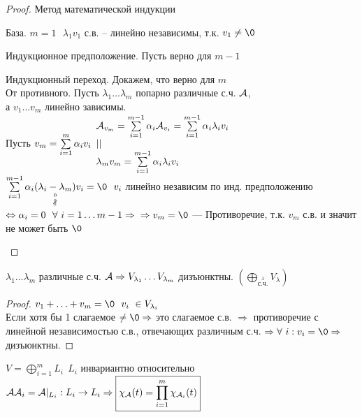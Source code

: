 \documentclass[../main.tex]{subfiles}
\begin{document}
	\begin{proof} Метод математической индукции
		\begin{mylist}
			\item База. $m=1 \ \ \ \lambda_1 v_1$ с.в. -- линейно независимы, т.к. $v_1\neq \0$
			\item Индукционное предположение. Пусть верно для $m-1$
			\item Индукционный переход. Докажем, что верно для $m$\\
			От противного. Пусть $\lambda_1\ldots \lambda_m $ попарно различные с.ч. $\A$,\\
			а $v_1\ldots v_m$ линейно зависимы.\\
			Пусть $v_m = \sum\limits_{i=1}^{m}\alpha_i v_i\\
			\begin{array}{l}
			\A_{v_m} = \sum\limits_{i=1}^{m-1}\alpha_i \A_{v_i} = \sum\limits_{i=1}^{m-1} \alpha_i \lambda_i v_i\\
			
			||
			\\
			\lambda_m v_m = \sum\limits_{i=1}^{m-1} \alpha_i \lambda_i v_i
			\end{array}$\\
			$\sum\limits_{i=1}^{m-1}\alpha_i(\underset{\stackrel{0}{\nparallel}}{\lambda_i - \lambda_m})v_i = \0 \ \ v_i$ линейно независим по инд. предположению\\
			$\Leftrightarrow \alpha_i = 0 \ \ \forall \ i=1\ldots m-1 \Rightarrow\\
			\Rightarrow v_m = \0$ --- Противоречие, т.к. $v_m$ с.в. и значит не может быть $\0$
		\end{mylist}
	\end{proof}
	\begin{corollary}
		$\lambda_1\ldots\lambda_m$ различные с.ч. $\A
		\Rightarrow  V_{\lambda_1}\ldots V_{\lambda_m}$ дизъюнктны.
		$\left(\bigoplus\limits_{\stackrel{\lambda}{\text{с.ч.}}} V_\lambda\right)$ 
	\end{corollary}
	\begin{proof}
		$v_1 + \ldots +v_m = \0 \ \ v_i\ \in V_{\lambda_i}$\\
		Если хотя бы 1 слагаемое $\neq \0 \Rightarrow$ это слагаемое с.в. $\Rightarrow$ противоречие с линейной независимостью с.в., отвечающих различным с.ч. $\Rightarrow \forall \ i: v_i = \0 \Rightarrow$ дизъюнктны. 
	\end{proof}
	\begin{theorem}
		$V = \bigoplus\limits_{i=1}^m L_i \ \ L_i$ инвариантно относительно $\A\\
		\A_i = \A|_{L_i} : L_i \rightarrow L_i
		\Rightarrow \boxed{\chi_\A(t) = \prod_{i=1}^{m}\chi_{\A_i}(t)}$
	\end{theorem}
\end{document}

